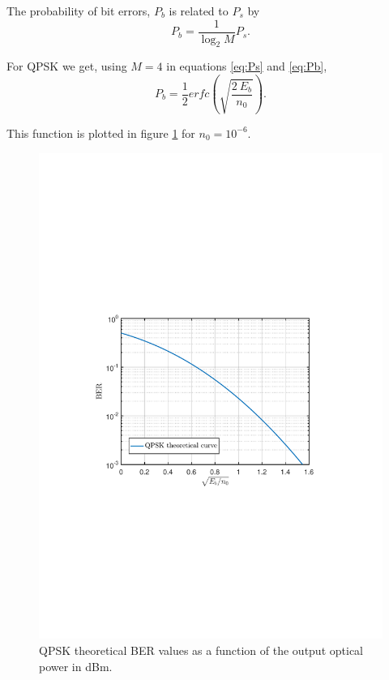 The probability of bit errors, $P_b$ is related to $P_s$ by
\begin{equation}
	P_b=\frac{1}{\log_2 M}P_s.
	\label{eq:Pb}
\end{equation} 

For QPSK we get, using $M=4$ in equations \ref{eq:Ps} and \ref{eq:Pb},
\begin{equation}
	P_b=\frac{1}{2} erfc\left(\sqrt{\frac{2~E_b}{n_0}}\right).
\end{equation}

This function is plotted in figure \ref{fig:QPSK_th_curve} for $n_0=10^{-6}$.

\begin{figure}[h]
		\centering
		\includegraphics[clip, trim=0.5cm 9cm 0.5cm 9cm, width=\textwidth]{./sdf/m_qam_system/figures/BER_QPSK_theory_Eb_n0.pdf}
		\caption{QPSK theoretical BER values as a function of the output optical power in dBm.}
		\label{fig:QPSK_th_curve}
\end{figure}

